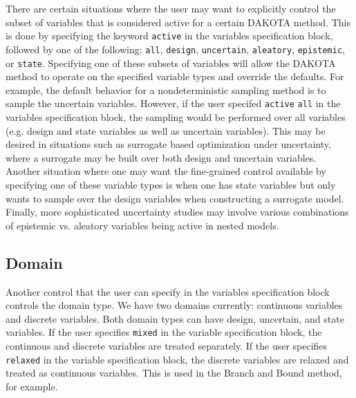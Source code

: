 There are certain situations where the user may want to explicitly 
control the subset of variables that is considered active for a 
certain DAKOTA method.  This is done by specifying the keyword 
\texttt{active} in the variables specification block, followed by 
one of the following:  \texttt{all}, \texttt{design}, \texttt{uncertain},
\texttt{aleatory}, \texttt{epistemic}, or \texttt{state}.  
Specifying one of these subsets of variables will allow the 
DAKOTA method to operate on the specified variable types and override 
the defaults.  For example, the default behavior for a 
nondeterministic sampling method is to sample the  uncertain 
variables.  However, if the user specifed \texttt{active}  \texttt{all} 
in the variables specification block, the sampling would be performed 
over all variables (e.g. design and state variables as well as 
uncertain variables).  This may be desired in situations such as 
surrogate based optimization under uncertainty, where a surrogate may 
be built over both design and uncertain variables.  
Another situation where one may want the fine-grained control 
available by specifying one of these variable types is when one 
has state variables but only wants to sample over the design 
variables when constructing a surrogate model.  Finally, 
more sophisticated uncertainty studies may involve various 
combinations of epistemic vs. aleatory variables being active 
in nested models.

\subsection{Domain}\label{variables:domain}
Another control that the user can specify in the variables specification 
block controls the domain type.  We have two domains currently:  
continuous variables and discrete variables.  Both domain types 
can have design, uncertain, and state variables.  If the user 
specifies \texttt{mixed} in the variable specification block, 
the continuous and discrete variables are treated separately. 
If the user specifies \texttt{relaxed} in the variable specification block, 
the discrete variables are relaxed and treated as continuous variables. 
This is used in the Branch and Bound method, for example. 


